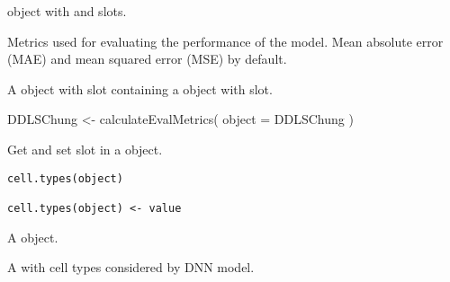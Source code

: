 \documentclass[a4paper]{book}
\begin{document}
%
\begin{Arguments}
\begin{ldescription}
\item[\code{object}]  object with  and
 slots.

\item[\code{metrics}] Metrics used for evaluating the performance of the model. Mean
absolute error (MAE) and mean squared error (MSE) by default.
\end{ldescription}
\end{Arguments}
%
\begin{Value}
A  object with  slot
containing a  object with
 slot.
\end{Value}
%
\begin{SeeAlso}\relax
{} 
 
\end{SeeAlso}
%
\begin{Examples}
\begin{ExampleCode}
DDLSChung <- calculateEvalMetrics(
  object = DDLSChung
)

\end{ExampleCode}
\end{Examples}
%
\begin{Description}\relax
Get and set  slot in a 
object.
\end{Description}
%
\begin{Usage}
\begin{verbatim}
cell.types(object)

cell.types(object) <- value
\end{verbatim}
\end{Usage}
%
\begin{Arguments}
\begin{ldescription}
\item[\code{object}] A  object.

\item[\code{value}] A  with cell types considered by DNN model.
\end{ldescription}
\end{Arguments}
\end{document}
